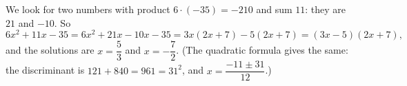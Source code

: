We look for two numbers with product $6\cdot(-35)=-210$ and sum $11$: they are $21$ and $-10$. So
\[
6x^2+11x-35=6x^2+21x-10x-35=3x(2x+7)-5(2x+7)=(3x-5)(2x+7),
\]
and the solutions are $x=\boxed{\dfrac{5}{3}}$ and $x=\boxed{-\dfrac{7}{2}}$. (The quadratic formula gives the same: the discriminant is $121+840=961=31^2$, and $x=\dfrac{-11\pm31}{12}$.)
